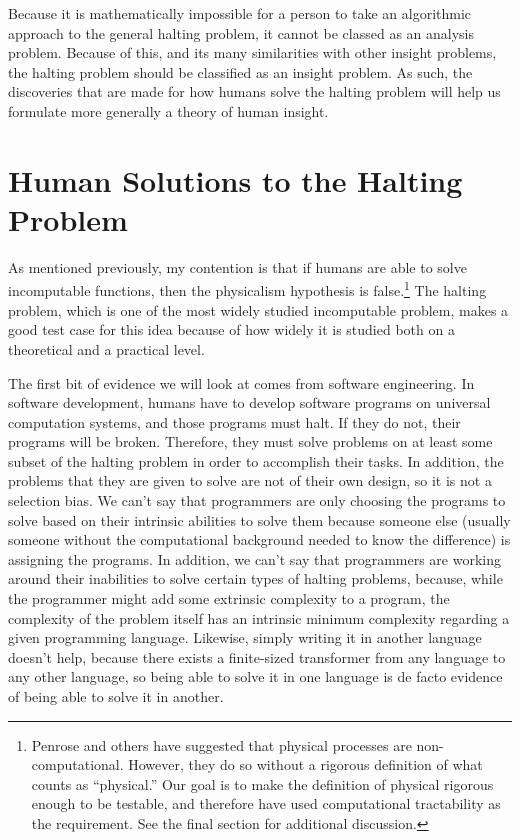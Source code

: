 Because it is mathematically impossible for a person to take an algorithmic approach to the general halting problem, it cannot be classed as an analysis problem.  Because of this, and its many similarities with other insight problems, the halting problem should be classified as an insight problem.  As such, the discoveries that are made for how humans solve the halting problem will help us formulate more generally a theory of human insight.

\section{Human Solutions to the Halting Problem}

As mentioned previously, my contention is that if humans are able to solve incomputable functions, then the physicalism hypothesis is false.\footnote{Penrose and others have suggested that physical processes are non-computational.  However, they do so without a rigorous definition of what counts as ``physical.''  Our goal is to make the definition of physical rigorous enough to be testable, and therefore have used computational tractability as the requirement.  See the final section for additional discussion.}  The halting problem, which is one of the most widely studied incomputable problem, makes a good test case for this idea because of how widely it is studied both on a theoretical and a practical level.

The first bit of evidence we will look at comes from software engineering.  In software development, humans have to develop software programs on universal computation systems, and those programs must halt.  If they do not, their programs will be broken.  Therefore, they must solve problems on at least some subset of the halting problem in order to accomplish their tasks.  In addition, the problems that they are given to solve are not of their own design, so it is not a selection bias.  We can't say that programmers are only choosing the programs to solve based on their intrinsic abilities to solve them because someone else (usually someone without the computational background needed to know the difference) is assigning the programs.  In addition, we can't say that programmers are working around their inabilities to solve certain types of halting problems, because, while the programmer might add some extrinsic complexity to a program, the complexity of the problem itself has an intrinsic minimum complexity regarding a given programming language.  Likewise, simply writing it in another language doesn't help, because there exists a finite-sized transformer from any language to any other language, so being able to solve it in one language is de facto evidence of being able to solve it in another.

